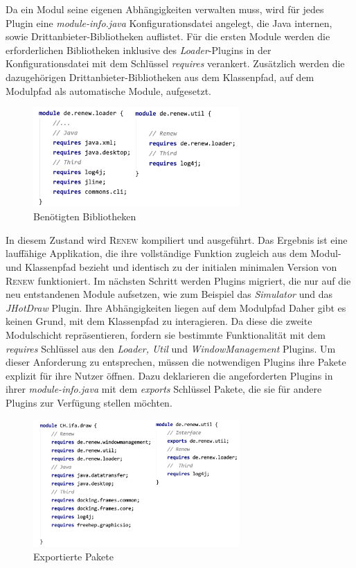 	Da ein Modul seine eigenen Abhängigkeiten verwalten muss, wird für jedes Plugin eine \textit{module-info.java} Konfigurationsdatei angelegt, die Java internen, sowie Drittanbieter-Bibliotheken auflistet. Für die ersten Module werden die erforderlichen Bibliotheken inklusive des \textit{Loader}-Plugins in der Konfigurationsdatei mit dem Schlüssel \textit{requires} verankert. Zusätzlich werden die  dazugehörigen Drittanbieter-Bibliotheken aus dem Klassenpfad, auf dem Modulpfad als automatische Module, aufgesetzt.

	\begin{figure}[h!]
	  \centering
	  \includegraphics[width=0.7\textwidth]{material/images/loaderUtil-info.png}
	  \caption{Benötigten Bibliotheken}
	  \label{fig:loaderUtil}
	\end{figure}

	In diesem Zustand wird \textsc{Renew} kompiliert und ausgeführt. Das Ergebnis ist eine lauffähige Applikation, die ihre vollständige Funktion zugleich aus dem Modul- und Klassenpfad bezieht und identisch zu der initialen minimalen Version von \textsc{Renew} funktioniert.\newline
	Im nächsten Schritt werden Plugins migriert, die nur auf die neu entstandenen Module aufsetzen, wie zum Beispiel das \textit{Simulator} und das \textit{JHotDraw} Plugin. Ihre Abhängigkeiten liegen auf dem Modulpfad Daher gibt es keinen Grund, mit dem Klassenpfad zu interagieren. \newline
	Da diese die zweite Modulschicht repräsentieren, fordern sie bestimmte Funktionalität mit dem \textit{requires} Schlüssel aus den \textit{Loader, Util} und \textit{WindowManagement} Plugins. Um dieser Anforderung zu entsprechen, müssen die notwendigen Plugins ihre Pakete  explizit für ihre Nutzer öffnen. Dazu deklarieren die angeforderten Plugins in ihrer \textit{module-info.java} mit dem \textit{exports} Schlüssel Pakete, die sie für andere Plugins zur Verfügung stellen möchten.

	\begin{figure}[h!]
	  \centering
	  \includegraphics[width=0.7\textwidth]{material/images/utilCH-info.png}
	  \caption{Exportierte Pakete}
	  \label{fig:utilCH}
	\end{figure}

